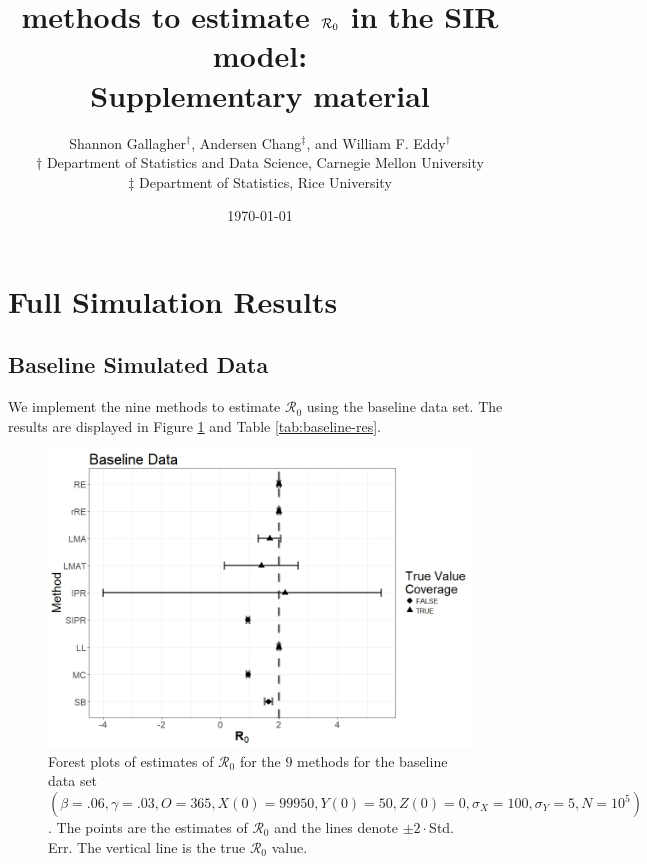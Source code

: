 \documentclass[12pt]{article}
\title{\Wxxsir methods to estimate $\rr$ in the SIR model: \\ Supplementary material}
\author{ Shannon Gallagher$^{\dag}$, Andersen Chang$^{\ddag}$, and William F. Eddy$^{\dag}$ \\$\dag$ Department of Statistics and Data Science, Carnegie Mellon University\\ $\ddag$ Department of Statistics, Rice University}
\date{\today}
\newcommand{\xxsir}{\ensuremath{9} } %
\newcommand{\wxxsir}{nine } %
\newcommand{\rr}{\ensuremath{\mathcal{R}_0}}
\begin{document}
\maketitle

\section{Full Simulation Results}

\subsection{Baseline Simulated Data}\label{sec:res-base}
We implement the \wxxsir methods to estimate $\rr$ using the baseline data set.  The results are displayed in Figure \ref{fig:baseline-res} and Table \ref{tab:baseline-res}.
\begin{figure}[H]
  \centering
  \includegraphics[scale=0.5]{images/BaseBase.jpeg}
  \caption{Forest plots of estimates of $\rr$ for the \xxsir methods for the baseline data set $(\beta=.06, \gamma=.03, O=365, X(0)=99950, Y(0)=50, Z(0)=0, \sigma_X=100, \sigma_Y=5, N=10^5)$.  The points are the estimates of $\rr$ and the lines denote $\pm 2\cdot $Std. Err.  The vertical line is the true $\rr$ value.}\label{fig:baseline-res}
  \end{figure}
\end{document}
